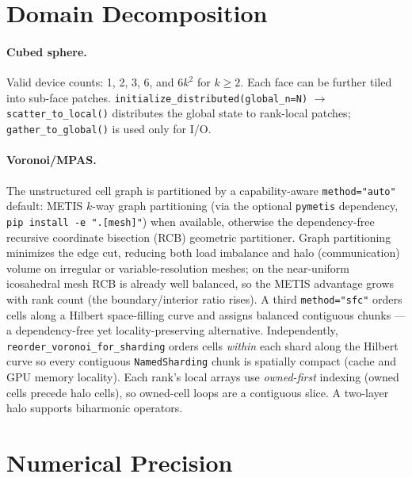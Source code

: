 \documentclass[11pt,twoside]{report}
\begin{document}
\section{Domain Decomposition}

\paragraph{Cubed sphere.}
Valid device counts: 1, 2, 3, 6, and $6k^2$ for $k\ge 2$.
Each face can be further tiled into sub-face patches.
\texttt{initialize\_distributed(global\_n=N)} $\to$
\texttt{scatter\_to\_local()} distributes the global state to rank-local
patches; \texttt{gather\_to\_global()} is used only for I/O.

\paragraph{Voronoi/MPAS.}
The unstructured cell graph is partitioned by a capability-aware
\texttt{method="auto"} default: METIS $k$-way graph partitioning (via the
optional \texttt{pymetis} dependency, \texttt{pip install -e ".[mesh]"}) when
available, otherwise the dependency-free recursive coordinate bisection (RCB)
geometric partitioner.  Graph partitioning minimizes the edge cut, reducing both
load imbalance and halo (communication) volume on irregular or
variable-resolution meshes; on the near-uniform icosahedral mesh RCB is already
well balanced, so the METIS advantage grows with rank count (the
boundary/interior ratio rises).  A third \texttt{method="sfc"} orders cells along
a Hilbert space-filling curve and assigns balanced contiguous chunks --- a
dependency-free yet locality-preserving alternative.  Independently,
\texttt{reorder\_voronoi\_for\_sharding} orders cells \emph{within} each shard
along the Hilbert curve so every contiguous \texttt{NamedSharding} chunk is
spatially compact (cache and GPU memory locality).  Each rank's local arrays use
\emph{owned-first} indexing (owned cells precede halo cells), so owned-cell loops
are a contiguous slice.  A two-layer halo supports biharmonic operators.

\section{Numerical Precision}
\label{sec:precision}
\end{document}
